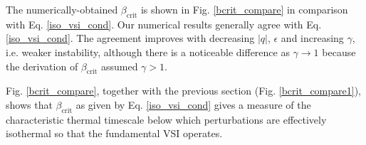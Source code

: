 The numerically-obtained $\beta_\mathrm{crit}$ is shown in
Fig. \ref{bcrit_compare} in comparison with Eq. \ref{iso_vsi_cond}.
Our numerical results generally agree with Eq. \ref{iso_vsi_cond}. The
agreement improves with decreasing  $|q|$,  $\epsilon$ and increasing
$\gamma$, i.e. weaker instability, although there is a noticeable difference
as $\gamma\to1$ because the derivation of $\beta_\mathrm{crit}$
assumed $\gamma>1$.   

Fig. \ref{bcrit_compare}, together with the previous section
(Fig. \ref{bcrit_compare1}), shows that $\beta_\mathrm{crit}$ as given
by Eq. \ref{iso_vsi_cond} gives a measure of the characteristic
thermal timescale below which perturbations are effectively isothermal
so that the fundamental VSI operates. 



